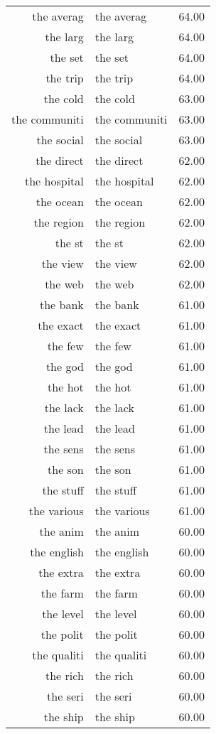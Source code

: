 \begin{table}[ht]
\begin{tabular}{rlr}
  the averag & the averag & 64.00 \\ 
  the larg & the larg & 64.00 \\ 
  the set & the set & 64.00 \\ 
  the trip & the trip & 64.00 \\ 
  the cold & the cold & 63.00 \\ 
  the communiti & the communiti & 63.00 \\ 
  the social & the social & 63.00 \\ 
  the direct & the direct & 62.00 \\ 
  the hospital & the hospital & 62.00 \\ 
  the ocean & the ocean & 62.00 \\ 
  the region & the region & 62.00 \\ 
  the st & the st & 62.00 \\ 
  the view & the view & 62.00 \\ 
  the web & the web & 62.00 \\ 
  the bank & the bank & 61.00 \\ 
  the exact & the exact & 61.00 \\ 
  the few & the few & 61.00 \\ 
  the god & the god & 61.00 \\ 
  the hot & the hot & 61.00 \\ 
  the lack & the lack & 61.00 \\ 
  the lead & the lead & 61.00 \\ 
  the sens & the sens & 61.00 \\ 
  the son & the son & 61.00 \\ 
  the stuff & the stuff & 61.00 \\ 
  the various & the various & 61.00 \\ 
  the anim & the anim & 60.00 \\ 
  the english & the english & 60.00 \\ 
  the extra & the extra & 60.00 \\ 
  the farm & the farm & 60.00 \\ 
  the level & the level & 60.00 \\ 
  the polit & the polit & 60.00 \\ 
  the qualiti & the qualiti & 60.00 \\ 
  the rich & the rich & 60.00 \\ 
  the seri & the seri & 60.00 \\ 
  the ship & the ship & 60.00 \\ 

\end{tabular}
\end{table}
